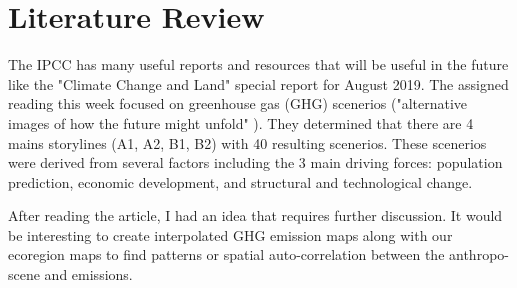 \documentclass[a4paper,10pt]{article}
\begin{document}
\section{Literature Review}
The IPCC has many useful reports and resources that will be useful in the future like the "Climate Change and Land" special report for August 2019. 
The assigned reading this week focused on greenhouse gas (GHG) scenerios ("alternative images of how the future might unfold" \cite{ipcc2000}). 
They determined that there are 4 mains storylines (A1, A2, B1, B2) with 40 resulting scenerios. These scenerios were derived from several factors including 
the 3 main driving forces: population prediction, economic development, and structural and technological change.

After reading the article, I had an idea that requires further discussion. It would be interesting to create interpolated GHG emission maps along with 
our ecoregion maps to find patterns or spatial auto-correlation between the anthropo-scene and emissions.
    



\end{document}
